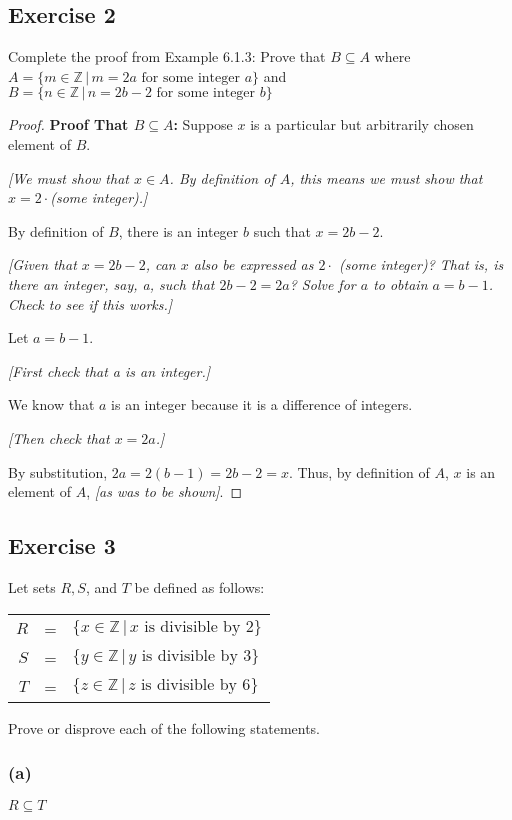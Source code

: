\documentclass[14pt]{extarticle}
\newcommand{\Z}{\mathbb{Z}}
\begin{document}
\subsection{Exercise 2}
Complete the proof from Example 6.1.3:
Prove that \(B \subseteq A\) where \(A = \{m \in \Z \, | \, m = 2a \text{ for some integer } a\}\) and
\(B = \{n \in \Z \, | \, n = 2b - 2 \text{ for some integer } b\}\)

\begin{proof}
  {\bf Proof That $B \subseteq A$:} Suppose $x$ is a particular but arbitrarily chosen element of $B$.

    {\it [We must show that $x \in A$. By definition of $A$, this means we must show that $x = 2 \cdot$(some integer).]}

  By definition of $B$, there is an integer $b$ such that \(x = 2b - 2\).

    {\it [Given that \(x = 2b - 2\), can $x$ also be expressed as $2 \cdot$ (some integer)? That is, is there an integer, say, a, such that \(2b - 2 = 2a\)? Solve for $a$ to obtain \(a = b - 1\). Check to see if this works.]}

  Let \(a = b - 1\).

    {\it [First check that a is an integer.]}

  We know that $a$ is an integer because it is a difference of integers.

    {\it [Then check that \(x = 2a\).]}

  By substitution, \(2a = 2(b - 1) = 2b - 2 = x\). Thus, by
  definition of $A$, $x$ is an element of $A$, {\it [as was to be shown]}.
\end{proof}

\subsection{Exercise 3}
Let sets $R, S$, and $T$ be defined as follows:
\begin{center}
  \begin{tabular}{rcl}
    $R$ & = & \(\{x \in \Z \, | \, x \text{ is divisible by 2} \}\) \\
    $S$ & = & \(\{y \in \Z \, | \, y \text{ is divisible by 3} \}\) \\
    $T$ & = & \(\{z \in \Z \, | \, z \text{ is divisible by 6} \}\)
  \end{tabular}
\end{center}
Prove or disprove each of the following statements.

\subsubsection{(a)}
\(R \subseteq T\)
\end{document}
